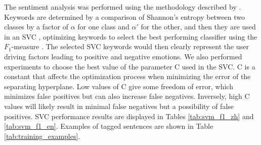 \documentclass[smallextended,natbib]{svjour3}       %
\begin{document}
    The sentiment analysis was performed using the methodology described by \cite{Aleman2018ICAROB}. Keywords are determined by a comparison of Shannon's entropy \cite[][]{shannon1948} between two classes by a factor of \(\alpha\) for one class and \(\alpha'\) for the other, and then they are used in an SVC \cite[][]{cortes1995}, optimizing keywords to select the best performing classifier using the \(F_1\)-measure \cite[][]{powers2011}. The selected SVC keywords would then clearly represent the user driving factors leading to positive and negative emotions. We also performed experiments to choose the best value of the parameter C used in the SVC. C is a constant that affects the optimization process when minimizing the error of the separating hyperplane. Low values of C give some freedom of error, which minimizes false positives but can also increase false negatives. Inversely, high C values will likely result in minimal false negatives but a possibility of false positives. SVC performance results are displayed in  Tables \ref{tab:svm_f1_zh} and \ref{tab:svm_f1_en}. Examples of tagged sentences are shown in Table \ref{tab:training_examples}. 
\end{document}
